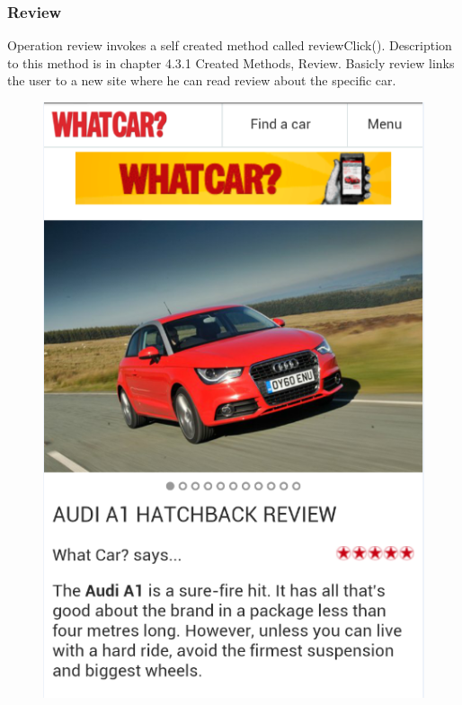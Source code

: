 \subsubsection{Review}
Operation review invokes a self created method called reviewClick(). Description to this method is in chapter 4.3.1 Created Methods, Review. Basicly review links the user to a new site where he can read review about the specific car.
\\
\begin{figure}[h]
\centering
\includegraphics[width=0.5\linewidth]{graphics/chapter4/9}
\caption{}
\label{fig:10}
\end{figure}
\newpage


